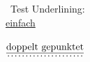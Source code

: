 






~Test Underlining:\\
\uline{einfach}\\
\\
$\dotuline{\uline{\textnormal{doppelt gepunktet}}}$\\


